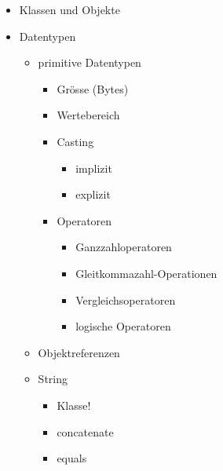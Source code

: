 \begin{itemize}
    \item Klassen und Objekte
    
    \item Datentypen
    \begin{itemize}
        \item primitive Datentypen
        \begin{itemize}
            \item Grösse (Bytes)
            \item Wertebereich
            \item Casting
            \begin{itemize}
                \item implizit
                \item explizit
            \end{itemize}
            \item Operatoren
            \begin{itemize}
                \item Ganzzahloperatoren
                \item Gleitkommazahl-Operationen
                \item Vergleichsoperatoren
                \item logische Operatoren
            \end{itemize}
        \end{itemize}
        \item Objektreferenzen
        \item String
            \begin{itemize}
                \item Klasse!
                \item concatenate
                \item equals
            \end{itemize} 
    \end{itemize}
    

\end{itemize}

